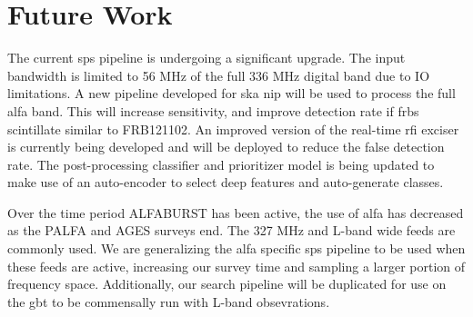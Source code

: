 \documentclass[a4paper,fleqn,usenatbib]{mnras}
\begin{document}
\section{Future Work}
\label{sec:future_work}

The current \gls*{sps} pipeline is undergoing a significant upgrade. The input
bandwidth is limited to 56 MHz of the full 336 MHz digital band due to IO
limitations. A new pipeline developed for \gls*{ska} \gls*{nip} will be used to
process the full \gls*{alfa} band. This will increase sensitivity, and improve
detection rate if \glspl*{frb} scintillate similar to FRB121102. An improved
version of the real-time \gls*{rfi} exciser is currently being developed and
will be deployed to reduce the false detection rate. The post-processing
classifier and prioritizer model is being updated to make use of an auto-encoder
to select deep features and auto-generate classes.

Over the time period ALFABURST has been active, the use of \gls*{alfa} has
decreased as the PALFA and AGES surveys end. The 327 MHz and L-band wide feeds
are commonly used. We are generalizing the \gls*{alfa} specific \gls*{sps}
pipeline to be used when these feeds are active, increasing our survey time and
sampling a larger portion of frequency space. Additionally, our search pipeline
will be duplicated for use on the \gls*{gbt} to be commensally run with L-band
obsevrations. 


 

\bsp	%
\label{lastpage}
\end{document}
